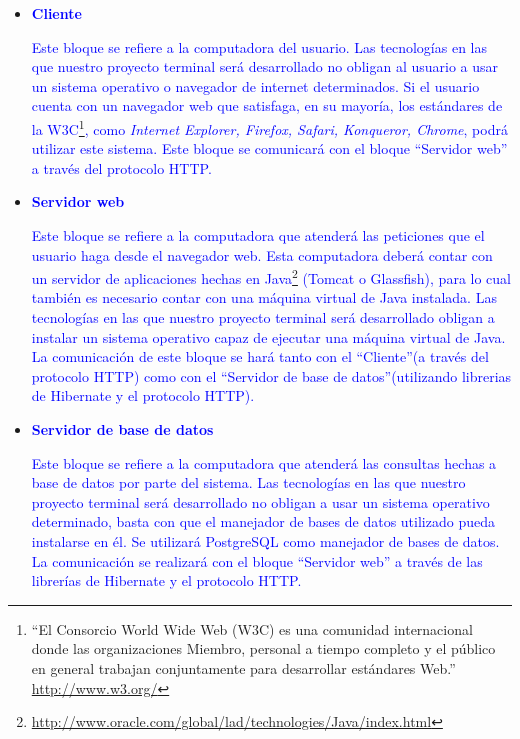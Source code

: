 \documentclass[11pt,letterpaper,titlepage]{article}
\begin{document}
\begin{itemize}
  \item \textcolor{blue}{\textbf{Cliente}}

\textcolor{blue}{Este bloque se refiere a la computadora del usuario. Las tecnolog\'ias en las que nuestro proyecto terminal ser\'a desarrollado no obligan al usuario a usar un sistema operativo o navegador de internet determinados. Si el usuario cuenta con un navegador web que satisfaga, en su mayor\'ia, los est\'andares de la W3C\footnote{``El Consorcio World Wide Web (W3C) es una comunidad internacional donde las organizaciones Miembro, personal a tiempo completo y el p\'ublico en general trabajan conjuntamente para desarrollar est\'andares Web.'' \href{http://www.w3.org/}{http://www.w3.org/}}, como \textit{Internet Explorer, Firefox, Safari, Konqueror, Chrome}, podr\'a utilizar este sistema. Este bloque se comunicar\'a con el bloque ``Servidor web'' a trav\'es del protocolo HTTP.}

  \item \textcolor{blue}{\textbf{Servidor web}}

\textcolor{blue}{Este bloque se refiere a la computadora que atender\'a las peticiones que el usuario haga desde el navegador web. Esta computadora deber\'a contar con un servidor de aplicaciones hechas en Java\footnote{\href{http://www.oracle.com/global/lad/technologies/Java/index.html}{http://www.oracle.com/global/lad/technologies/Java/index.html}}  (Tomcat o Glassfish), para lo cual tambi\'en es necesario contar con una m\'aquina virtual de Java instalada. Las tecnolog\'ias en las que nuestro proyecto terminal ser\'a desarrollado obligan a instalar un sistema operativo capaz de ejecutar una m\'aquina virtual de Java.  La comunicaci\'on de este bloque se har\'a tanto con el ``Cliente''(a trav\'es del protocolo HTTP) como con el ``Servidor de base de datos''(utilizando librerias de Hibernate y el protocolo HTTP).}

  \item \textcolor{blue}{\textbf{Servidor de base de datos}}

\textcolor{blue}{Este bloque se refiere a la computadora que atender\'a las consultas hechas a base de datos por parte del sistema. Las tecnolog\'ias en las que nuestro proyecto terminal ser\'a desarrollado no obligan a usar un sistema operativo determinado, basta con que el manejador de bases de datos utilizado pueda instalarse en \'el. Se utilizar\'a PostgreSQL como manejador de bases de datos. La comunicaci\'on se realizar\'a con el bloque ``Servidor web'' a trav\'es de las librer\'ias de Hibernate y el protocolo HTTP. }

\end{itemize}
\end{document}
